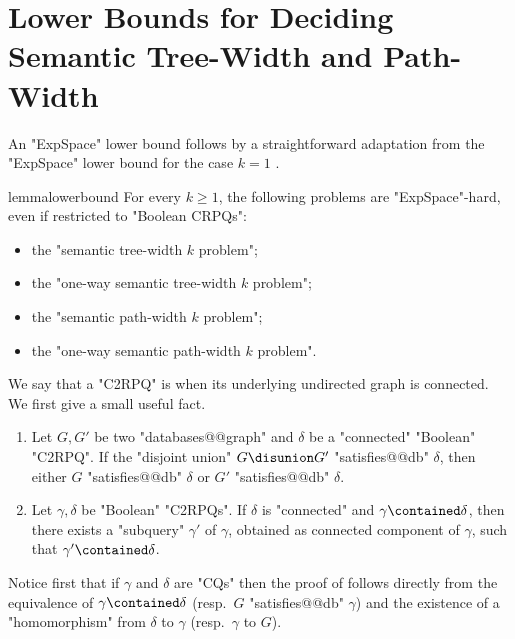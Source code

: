 

\section{\AP{}Lower Bounds for Deciding Semantic Tree-Width and Path-Width}
\label{sec:lowerbound}

An "ExpSpace" lower bound follows by a straightforward adaptation from the
"ExpSpace" lower bound for the case $k=1$ \cite[Proposition 6.2]{BarceloRomeroVardi2016SemanticAcyclicity}.
\begin{restatable}{lemma}{lowerbound}
    \AP\label{lemma:lowerbound}
    For every $k\geq 1$, the following problems are "ExpSpace"-hard, even if restricted to "Boolean CRPQs":
	\begin{itemize}
		\item the "semantic tree-width $k$ problem";
		\item the "one-way semantic tree-width $k$ problem";
		\item the "semantic path-width $k$ problem";
		\item the "one-way semantic path-width $k$ problem".
	\end{itemize}
\end{restatable}

\AP We say that a "C2RPQ" is  when its underlying undirected graph is connected.
We first give a small useful fact.

\begin{fact}
    \AP\label{fact:connectedness}\leavevmode
    \begin{enumerate}
        \item Let $G, G'$ be two "databases@@graph" and $\delta$ be a "connected" "Boolean" "C2RPQ".
            If the "disjoint union" $G \disunion G'$ "satisfies@@db" $\delta$, then either $G$ "satisfies@@db" $\delta$ or
            $G'$ "satisfies@@db" $\delta$.
        \item Let $\gamma,\delta$ be "Boolean" "C2RPQs". If $\delta$ is "connected"
            and $\gamma \contained \delta$, then there exists a "subquery" $\gamma'$ of $\gamma$,
            obtained as connected component of $\gamma$, such that
            $\gamma' \contained \delta$. 
    \end{enumerate}
\end{fact}

Notice first that if $\gamma$ and $\delta$ are "CQs" then the proof of
 follows directly from the equivalence of $\gamma \contained \delta$ (resp.\ $G$ "satisfies@@db" $\gamma$) and the existence of a "homomorphism" from $\delta$ to $\gamma$ (resp.\ $\gamma$ to $G$).

